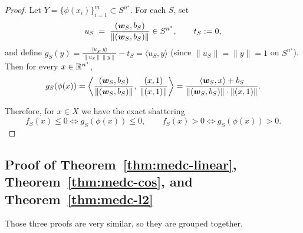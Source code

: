 \begin{proof}
Let $Y=\{\phi(x_i)\}_{i=1}^m\subset S^{n^\star}$. For each $S$, set
\[
u_S\;=\;\frac{(\bm{w}_S,b_S)}{\|(\bm{w}_S,b_S)\|}\in S^{n^\star},\qquad t_S:=0,
\]
and define $g_S(y)=\tfrac{\langle u_S,y\rangle}{\|u_S\|\|y\|}-t_S=\langle u_S,y\rangle$ (since $\|u_S\|=\|y\|=1$ on $S^{n^\star}$).
Then for every $x\in\mathbb{R}^{n^\star}$,
\[
g_S(\phi(x))
=\left\langle \frac{(\bm{w}_S,b_S)}{\|(\bm{w}_S,b_S)\|},\,\frac{(x,1)}{\|(x,1)\|}\right\rangle
=\frac{\langle \bm{w}_S,x\rangle+b_S}{\|(\bm{w}_S,b_S)\|\cdot\|(x,1)\|}.
\]

Therefore, for $x\in X$ we have the exact shattering
\[
f_S(x)\le 0 \iff g_S(\phi(x))\le 0,\qquad
f_S(x)>0 \iff g_S(\phi(x))>0.
\]
\end{proof}

\subsection{Proof of Theorem~\ref{thm:medc-linear}, Theorem~\ref{thm:medc-cos}, and Theorem~\ref{thm:medc-l2}}\label{app:proof:thm:maed-linear}

Those three proofs are very similar, so they are grouped together.

